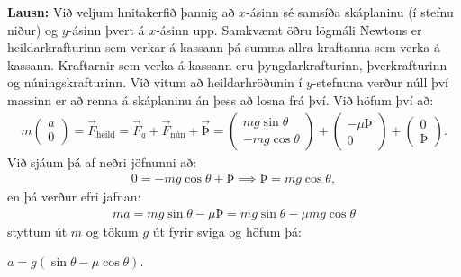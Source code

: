 \ifdefined \wholebook \else\documentclass[oneside]{book}\usepackage{EdlBook}\graphicspath{{figures/}}
\begin{document}
\textbf{Lausn:} Við veljum hnitakerfið þannig að $x$-ásinn sé samsíða skáplaninu (í stefnu niður) og $y$-ásinn þvert á $x$-ásinn upp. Samkvæmt öðru lögmáli Newtons er heildarkrafturinn sem verkar á kassann þá summa allra kraftanna sem verka á kassann. Kraftarnir sem verka á kassann eru þyngdarkrafturinn, þverkrafturinn og núningskrafturinn. Við vitum að heildarhröðunin í $y$-stefnuna verður núll því massinn er að renna á skáplaninu án þess að losna frá því. Við höfum því að:
\begin{align*}
    m \begin{pmatrix}
    a \\
    0
    \end{pmatrix} = \vec{F}_{\text{heild}} =  \vec{F}_g + \vec{F}_{\text{nún}} + \vec{Þ} = \begin{pmatrix}
    mg\sin\theta \\
    -mg\cos\theta
    \end{pmatrix} + \begin{pmatrix}
    -\mu Þ \\
    0
    \end{pmatrix} + \begin{pmatrix}
    0 \\
    Þ
    \end{pmatrix}.
\end{align*}
Við sjáum þá af neðri jöfnunni að:
\begin{align*}
    0 = -mg\cos\theta + Þ \implies Þ = mg\cos\theta,
\end{align*}
en þá verður efri jafnan:
\begin{align*}
    ma = mg\sin\theta - \mu Þ = mg\sin\theta - \mu mg\cos\theta
\end{align*}
styttum út $m$ og tökum $g$ út fyrir sviga og höfum þá:
\begin{center}
\begin{tcbox}[nobeforeafter]{$a = g\left( \sin\theta - \mu \cos\theta \right).$}
\end{tcbox}
\end{center}

\end{document}
